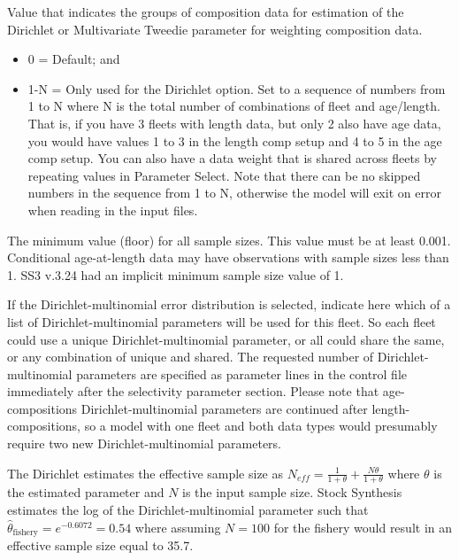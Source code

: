 
Value that indicates the groups of composition data for estimation of the Dirichlet or Multivariate Tweedie parameter for weighting composition data.

\begin{itemize}
	\item 0 = Default; and
	\item 1-N = Only used for the Dirichlet option. Set to a sequence of numbers from 1 to N where N is the total number of combinations of fleet and age/length. That is, if you have 3 fleets with length data, but only 2 also have age data, you would have values 1 to 3 in the length comp setup and 4 to 5 in the age comp setup. You can also have a data weight that is shared across fleets by repeating values in Parameter Select. Note that there can be no skipped numbers in the sequence from 1 to N, otherwise the model will exit on error when reading in the input files.
\end{itemize}	

The minimum value (floor) for all sample sizes. This value must be at least 0.001. Conditional age-at-length data may have observations with sample sizes less than 1. SS3 v.3.24 had an implicit minimum sample size value of 1.

If the Dirichlet-multinomial error distribution is selected, indicate here which of a list of Dirichlet-multinomial parameters will be used for this fleet.  So each fleet could use a unique Dirichlet-multinomial parameter, or all could share the same, or any combination of unique and shared.  The requested number of Dirichlet-multinomial parameters are specified as parameter lines in the control file immediately after the selectivity parameter section. Please note that age-compositions Dirichlet-multinomial parameters are continued after length-compositions, so a model with one fleet and both data types would presumably require two new Dirichlet-multinomial parameters.  	
	
The Dirichlet estimates the effective sample size as $N_{eff}=\frac{1}{1+\theta}+\frac{N\theta}{1+\theta}$ where $\theta$ is the estimated parameter and $N$ is the input sample size.  Stock Synthesis estimates the log of the Dirichlet-multinomial parameter such that $\hat{\theta}_{\text{fishery}} = e^{-0.6072} = 0.54$ where assuming $N=100$ for the fishery would result in an effective sample size equal to 35.7.
	
